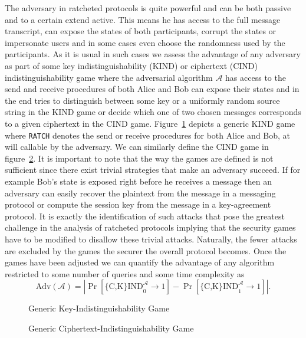 \documentclass[11pt,a4paper,twoside,openright,bibliography=totoc]{scrbook}
\renewcommand{\t}{\text} %
\begin{document}
The adversary in ratcheted protocols is quite powerful and can be both
passive and to a certain extend active. This means he has access to
the full message transcript, can expose the states of both
participants, corrupt the states or impersonate users and in some
cases even choose the randomness used by the participants. As it is
usual in such cases we assess the advantage of any adversary as part
of some key indistinguishability (KIND) or ciphertext (CIND)
indistinguishability game where the adversarial algorithm $\mathcal{A}$
has access to the send and receive procedures of both Alice and Bob can expose their states
and in the end tries to distinguish between some key or a uniformly
random source string in the KIND
game or decide which one of two chosen messages corresponds to a given
ciphertext in the CIND game.
Figure~\ref{fig:kind} depicts a generic KIND game where \texttt{RATCH} denotes
the send or receive procedures for both Alice and Bob, at will callable by the
adversary. We can similarly define the CIND game in figure~\ref{fig:cind}.
It is important to note that the way the games are defined is
not sufficient since there exist trivial strategies that make an adversary
succeed. If for example Bob's state is exposed right before he
receives a message then an adversary can easily recover the plaintext
from the message in a messaging protocol or compute the session key
from the message in a key-agreement protocol. It is exactly the
identification of such attacks that pose the greatest
challenge in the analysis of ratcheted protocols implying that the security games
have to be modified to disallow these trivial attacks. Naturally,
the fewer attacks are excluded by the games the securer the overall
protocol becomes. Once the games have been adjusted we can
quantify the advantage of any algorithm restricted to some number of queries
and some time complexity as
\[
  \t{Adv}(\mathcal{A}) = \left| \Pr \left[ \t{\{C,K\}IND}_0^\mathcal{A} \rightarrow 1 \right] -
                                \Pr \left[ \t{\{C,K\}IND}_1^\mathcal{A} \rightarrow 1 \right]
                         \right|.
\]

\begin{figure}[ht]
  \centering
  \setlength{\fboxsep}{10pt}
  \scalebox{0.9}{%
    \fbox{%
      
    }
  }
  \caption{Generic Key-Indistinguishability Game}
  \label{fig:kind}
\end{figure}

\begin{figure}[ht]
  \centering
  \setlength{\fboxsep}{10pt}
  \scalebox{0.9}{%
    \fbox{%
      
    }
  }
  \caption{Generic Ciphertext-Indistinguishability Game}
  \label{fig:cind}
\end{figure}
\end{document}
